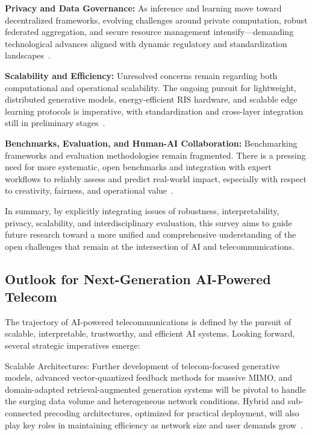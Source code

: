 \documentclass[sigconf]{acmart}
\begin{document}
\textbf{Privacy and Data Governance:} As inference and learning move toward decentralized frameworks, evolving challenges around private computation, robust federated aggregation, and secure resource management intensify—demanding technological advances aligned with dynamic regulatory and standardization landscapes~\cite{ref24, ref25, ref26, ref27, ref38, ref39, ref40}.

\textbf{Scalability and Efficiency:} Unresolved concerns remain regarding both computational and operational scalability. The ongoing pursuit for lightweight, distributed generative models, energy-efficient RIS hardware, and scalable edge learning protocols is imperative, with standardization and cross-layer integration still in preliminary stages~\cite{ref28, ref31, ref32, ref33, ref34, ref35, ref36}.

\textbf{Benchmarks, Evaluation, and Human-AI Collaboration:} Benchmarking frameworks and evaluation methodologies remain fragmented. There is a pressing need for more systematic, open benchmarks and integration with expert workflows to reliably assess and predict real-world impact, especially with respect to creativity, fairness, and operational value~\cite{ref6, ref13, ref19}.

In summary, by explicitly integrating issues of robustness, interpretability, privacy, scalability, and interdisciplinary evaluation, this survey aims to guide future research toward a more unified and comprehensive understanding of the open challenges that remain at the intersection of AI and telecommunications.

\subsection{Outlook for Next-Generation AI-Powered Telecom}

The trajectory of AI-powered telecommunications is defined by the pursuit of scalable, interpretable, trustworthy, and efficient AI systems. Looking forward, several strategic imperatives emerge:

Scalable Architectures: Further development of telecom-focused generative models, advanced vector-quantized feedback methods for massive MIMO, and domain-adapted retrieval-augmented generation systems will be pivotal to handle the surging data volume and heterogeneous network conditions. Hybrid and sub-connected precoding architectures, optimized for practical deployment, will also play key roles in maintaining efficiency as network size and user demands grow~\cite{ref13,ref14,ref15,ref28}.
\end{document}
